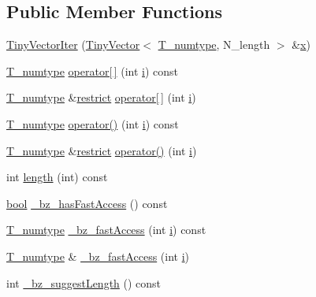 \subsection*{Public Member Functions}
\begin{DoxyCompactItemize}
\item 
\hyperlink{classTinyVectorIter_a2497ddbd5debcbae967c04bf30a1e283}{Tiny\+Vector\+Iter} (\hyperlink{classTinyVector}{Tiny\+Vector}$<$ \hyperlink{classTinyVectorIter_ab04e0c7e17b2742a45a7d52e8d5c6642}{T\+\_\+numtype}, N\+\_\+length $>$ \&\hyperlink{vecnorm1_8cc_ac73eed9e41ec09d58f112f06c2d6cb63}{x})
\item 
\hyperlink{classTinyVectorIter_ab04e0c7e17b2742a45a7d52e8d5c6642}{T\+\_\+numtype} \hyperlink{classTinyVectorIter_ab437586230654bb1c1a5f71fe4e32431}{operator\mbox{[}$\,$\mbox{]}} (int \hyperlink{indexexpr_8h_aabd77643995707c185e95c8cb2782c81}{i}) const 
\item 
\hyperlink{classTinyVectorIter_ab04e0c7e17b2742a45a7d52e8d5c6642}{T\+\_\+numtype} \&\hyperlink{compiler_8h_a080abdcb9c02438f1cd2bb707af25af8}{restrict} \hyperlink{classTinyVectorIter_a872554f9032c7126ded34dee29be98e7}{operator\mbox{[}$\,$\mbox{]}} (int \hyperlink{indexexpr_8h_aabd77643995707c185e95c8cb2782c81}{i})
\item 
\hyperlink{classTinyVectorIter_ab04e0c7e17b2742a45a7d52e8d5c6642}{T\+\_\+numtype} \hyperlink{classTinyVectorIter_a4a5ddd2ce17fdd9b5883f61102d584b7}{operator()} (int \hyperlink{indexexpr_8h_aabd77643995707c185e95c8cb2782c81}{i}) const 
\item 
\hyperlink{classTinyVectorIter_ab04e0c7e17b2742a45a7d52e8d5c6642}{T\+\_\+numtype} \&\hyperlink{compiler_8h_a080abdcb9c02438f1cd2bb707af25af8}{restrict} \hyperlink{classTinyVectorIter_aa89d5f9b28d705c8d3af950a7a874ae4}{operator()} (int \hyperlink{indexexpr_8h_aabd77643995707c185e95c8cb2782c81}{i})
\item 
int \hyperlink{classTinyVectorIter_a45d0185f2bfc4b7918eafe8d95984105}{length} (int) const 
\item 
\hyperlink{compiler_8h_abb452686968e48b67397da5f97445f5b}{bool} \hyperlink{classTinyVectorIter_aee7dbcdb52fa6df7a69fd646d4adf166}{\+\_\+bz\+\_\+has\+Fast\+Access} () const 
\item 
\hyperlink{classTinyVectorIter_ab04e0c7e17b2742a45a7d52e8d5c6642}{T\+\_\+numtype} \hyperlink{classTinyVectorIter_af31e154d18372fe52966ae6197a18f64}{\+\_\+bz\+\_\+fast\+Access} (int \hyperlink{indexexpr_8h_aabd77643995707c185e95c8cb2782c81}{i}) const 
\item 
\hyperlink{classTinyVectorIter_ab04e0c7e17b2742a45a7d52e8d5c6642}{T\+\_\+numtype} \& \hyperlink{classTinyVectorIter_a2af3e6100212b2d99f127f462185cd7b}{\+\_\+bz\+\_\+fast\+Access} (int \hyperlink{indexexpr_8h_aabd77643995707c185e95c8cb2782c81}{i})
\item 
int \hyperlink{classTinyVectorIter_a75287da4d8a0c8f2f8d5037346f47706}{\+\_\+bz\+\_\+suggest\+Length} () const 
\end{DoxyCompactItemize}
